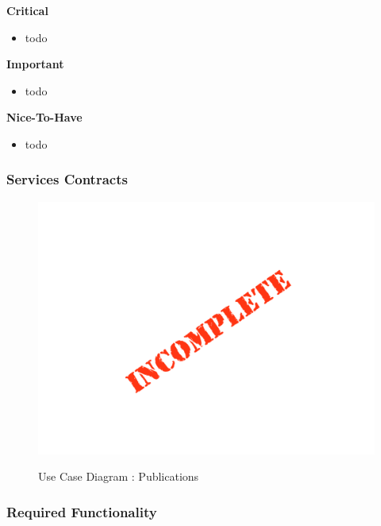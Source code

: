 \documentclass{article}
\begin{document}
		\begin{flushleft}
		\textbf{Critical}
			\begin{itemize}
					\item todo
			\end{itemize}

		\textbf{Important}
			\begin{itemize}
					\item todo
			\end{itemize}

		\textbf{Nice-To-Have}
			\begin{itemize}
					\item todo
			\end{itemize}
	\end{flushleft}

	\subsubsection{Services Contracts}

	\begin{figure}[H]
	\includegraphics[width=\textwidth]{images/Incomplete.png}  \\
	\caption{Use Case Diagram : Publications}
	\end{figure}

	\subsubsection{Required Functionality}
\end{document}
